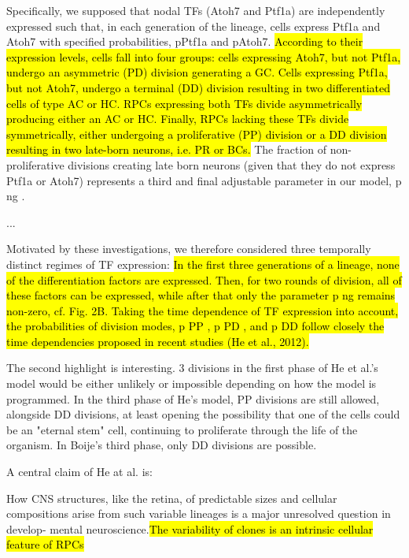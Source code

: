 \documentclass{ut-thesis}
\begin{document}
\begin{longquote}
Specifically, we supposed that nodal TFs (Atoh7 and Ptf1a) are independently
expressed such that, in each generation of the lineage, cells express Ptf1a and Atoh7 with specified
probabilities, pPtf1a and pAtoh7. \hl{According to their expression levels, cells fall into four groups: cells
expressing Atoh7, but not Ptf1a, undergo an asymmetric (PD) division generating a GC. Cells
expressing Ptf1a, but not Atoh7, undergo a terminal (DD) division resulting in two differentiated cells
of type AC or HC. RPCs expressing both TFs divide asymmetrically producing either an AC or HC.
Finally, RPCs lacking these TFs divide symmetrically, either undergoing a proliferative (PP) division
or a DD division resulting in two late-born neurons, i.e. PR or BCs.} The fraction of non-proliferative
divisions creating late born neurons (given that they do not express Ptf1a or Atoh7) represents a third
and final adjustable parameter in our model, p ng .

...

 Motivated by these
investigations, we therefore considered three temporally distinct regimes of TF expression: \hl{In the first
three generations of a lineage, none of the differentiation factors are expressed. Then, for two rounds of
division, all of these factors can be expressed, while after that only the parameter p ng remains non-zero,
cf. Fig. 2B. Taking the time dependence of TF expression into account, the probabilities of division
modes, p PP , p PD , and p DD follow closely the time dependencies proposed in recent studies (He et al.,
2012).}

\end{longquote}

\bigskip

The second highlight is interesting. 3 divisions in the first phase of He et al.'s model would be either unlikely or impossible depending on how the model is programmed. In the third phase of He's model, PP divisions are still allowed, alongside DD divisions, at least opening the possibility that one of the cells could be an "eternal stem" cell, continuing to proliferate through the life of the organism. In Boije's third phase, only DD divisions are possible.

\bigskip

A central claim of He at al. is:

\bigskip

\begin{longquote}
How CNS structures, like the
retina, of predictable sizes and cellular compositions arise from
such variable lineages is a major unresolved question in develop-
mental neuroscience.\hl{The variability of clones is an intrinsic cellular feature of RPCs}
\end{longquote}
\end{document}
